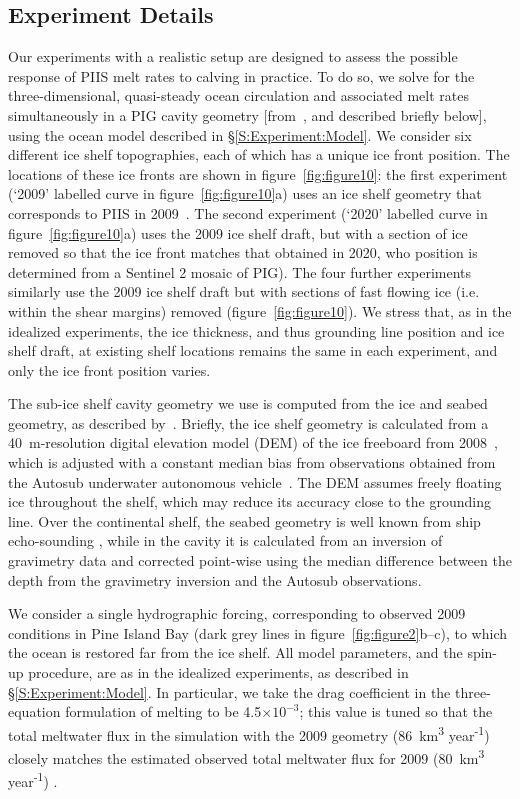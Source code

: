 \documentclass[draft]{agujournal2019}
\begin{document}
\subsection{Experiment Details}
Our experiments with a realistic setup are designed to assess the possible response of PIIS melt rates to calving in practice. To do so, we solve for the three-dimensional, quasi-steady ocean circulation and associated melt rates simultaneously in a PIG cavity geometry [from~, and described briefly below], using the ocean model described in \S\ref{S:Experiment:Model}. We consider six different ice shelf topographies, each of which has a unique ice front position. The locations of these ice fronts are shown in figure~\ref{fig:figure10}: the first experiment (`2009' labelled curve in figure~\ref{fig:figure10}a) uses an ice shelf geometry that corresponds to PIIS in 2009~\cite{Dutrieux2014Science}. The second experiment (`2020' labelled curve in figure~\ref{fig:figure10}a) uses the 2009 ice shelf draft, but with a section of ice removed so that the ice front matches that obtained in 2020, who position is determined from a Sentinel 2 mosaic of PIG). The four further experiments similarly use the 2009 ice shelf draft but with sections of fast flowing ice (i.e. within the shear margins) removed (figure~\ref{fig:figure10}). We stress that, as in the idealized experiments, the ice thickness, and thus grounding line position and ice shelf draft, at existing shelf locations remains the same in each experiment, and only the ice front position varies.

The sub-ice shelf cavity geometry we use is computed from the ice and seabed geometry, as described by~. Briefly, the ice shelf geometry is calculated from a 40~m-resolution digital elevation model (DEM) of the ice freeboard from 2008~\cite{Korona2009Photogrammetry}, which is adjusted with a constant median bias from observations obtained from the Autosub underwater autonomous vehicle~\cite{Jenkins2010NatureGeo}. The DEM assumes freely floating ice throughout the shelf, which may reduce its accuracy close to the grounding line. Over the continental shelf, the seabed geometry is well known from ship echo-sounding \cite{Dutrieux2014Science}, while in the cavity it is calculated from an inversion of gravimetry data and corrected point-wise using the median difference between the depth from the gravimetry inversion and the Autosub observations.

We consider a single hydrographic forcing, corresponding to observed 2009 conditions in Pine Island Bay (dark grey lines in figure~\ref{fig:figure2}b--c), to which the ocean is restored far from the ice shelf. All model parameters, and the spin-up procedure, are as in the idealized experiments, as described in \S\ref{S:Experiment:Model}. In particular, we take the drag coefficient in the three-equation formulation of melting to be 4.5$\times10^{-3}$; this value is tuned so that the total meltwater flux in the simulation with the 2009 geometry (86~km\textsuperscript{3} year\textsuperscript{-1}) closely matches the estimated observed total meltwater flux for 2009 (80~km\textsuperscript{3} year\textsuperscript{-1}) \cite{Dutrieux2014Science}.
\end{document}

